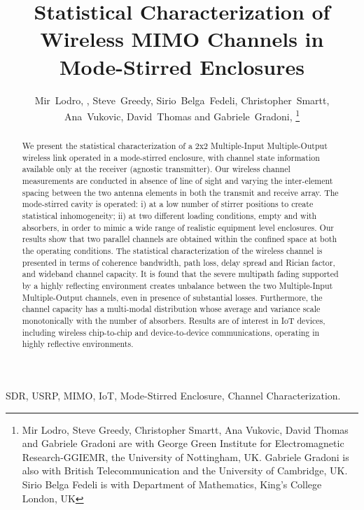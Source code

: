 \documentclass[10pt, final, journal, letterpaper, oneside, twocolumn]{IEEEtran}
\begin{document}
\title{Statistical Characterization of Wireless MIMO Channels in Mode-Stirred Enclosures}
\author{Mir~Lodro, , Steve~Greedy, Sirio~Belga~Fedeli, Christopher~Smartt, Ana~Vukovic, David~Thomas and Gabriele~Gradoni,  \vspace{-0.75cm}
\thanks{Mir Lodro, Steve Greedy, Christopher Smartt, Ana Vukovic, David Thomas and Gabriele Gradoni are with George Green Institute for Electromagnetic Research-GGIEMR, the University of Nottingham, UK. Gabriele Gradoni is also with British Telecommunication and the University of Cambridge, UK. Sirio Belga Fedeli is with Department of Mathematics, King's College London, UK}}
\maketitle
\begin{abstract}
We present the statistical characterization of a 2x2 Multiple-Input Multiple-Output wireless link operated in a mode-stirred enclosure, with channel state information available only at the receiver (agnostic transmitter). Our wireless channel measurements are conducted in absence of line of sight and varying the inter-element spacing between the two antenna elements in both the transmit and receive array. The mode-stirred cavity is operated: i) at a low number of stirrer positions to create statistical inhomogeneity; ii) at two different loading conditions, empty and with absorbers, in order to mimic a wide range of realistic equipment level enclosures. Our results show that two parallel channels are obtained within the confined space at both the operating conditions. The statistical characterization of the wireless channel is presented in terms of coherence bandwidth, path loss, delay spread and Rician factor, and wideband channel capacity. It is found that the severe multipath fading supported by a highly reflecting environment creates unbalance between the two Multiple-Input Multiple-Output channels, even in presence of substantial losses. Furthermore, the channel capacity has a multi-modal distribution whose average and variance scale monotonically with the number of absorbers. 
Results are of interest in IoT devices, including wireless chip-to-chip and device-to-device communications, operating in highly reflective environments. 
\end{abstract}
%
%
%
\vspace{-0.17cm}
\begin{IEEEkeywords}
SDR, USRP, MIMO, IoT, Mode-Stirred Enclosure, Channel Characterization.
\end{IEEEkeywords}
%
%
%
%
\vspace{-0.35cm}
\end{document}
